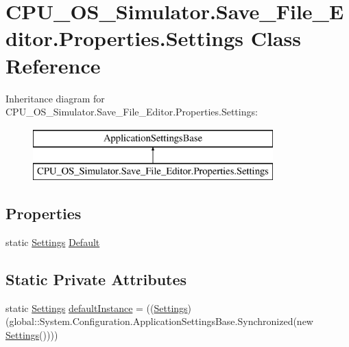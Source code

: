\hypertarget{class_c_p_u___o_s___simulator_1_1_save___file___editor_1_1_properties_1_1_settings}{}\section{C\+P\+U\+\_\+\+O\+S\+\_\+\+Simulator.\+Save\+\_\+\+File\+\_\+\+Editor.\+Properties.\+Settings Class Reference}
\label{class_c_p_u___o_s___simulator_1_1_save___file___editor_1_1_properties_1_1_settings}
Inheritance diagram for C\+P\+U\+\_\+\+O\+S\+\_\+\+Simulator.\+Save\+\_\+\+File\+\_\+\+Editor.\+Properties.\+Settings\+:\begin{figure}[H]
\begin{center}
\leavevmode
\includegraphics[height=2.000000cm]{class_c_p_u___o_s___simulator_1_1_save___file___editor_1_1_properties_1_1_settings}
\end{center}
\end{figure}
\subsection*{Properties}
\begin{DoxyCompactItemize}
\item 
static \hyperlink{class_c_p_u___o_s___simulator_1_1_save___file___editor_1_1_properties_1_1_settings}{Settings} \hyperlink{class_c_p_u___o_s___simulator_1_1_save___file___editor_1_1_properties_1_1_settings_a3db80e49faed58731091e92cb2a32e85}{Default}
\end{DoxyCompactItemize}
\subsection*{Static Private Attributes}
\begin{DoxyCompactItemize}
\item 
static \hyperlink{class_c_p_u___o_s___simulator_1_1_save___file___editor_1_1_properties_1_1_settings}{Settings} \hyperlink{class_c_p_u___o_s___simulator_1_1_save___file___editor_1_1_properties_1_1_settings_a5aa7265e5e9c87675b9534464780f3fd}{default\+Instance} = ((\hyperlink{class_c_p_u___o_s___simulator_1_1_save___file___editor_1_1_properties_1_1_settings}{Settings})(global\+::\+System.\+Configuration.\+Application\+Settings\+Base.\+Synchronized(new \hyperlink{class_c_p_u___o_s___simulator_1_1_save___file___editor_1_1_properties_1_1_settings}{Settings}())))
\end{DoxyCompactItemize}


